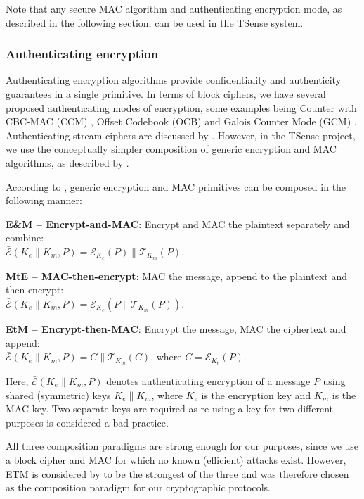 Note that any secure MAC algorithm and authenticating encryption mode, as described in the following section, can be used in the TSense system.

\subsubsection{Authenticating encryption}

Authenticating encryption algorithms provide confidentiality and authenticity guarantees in a single primitive. In terms of block ciphers, we have several proposed authenticating modes of encryption, some examples being Counter with CBC-MAC (CCM) , Offset Codebook (OCB)  and Galois Counter Mode (GCM) . Authenticating stream ciphers are discussed by . However, in the TSense project, we use the conceptually simpler composition of generic encryption and MAC algorithms, as described by .

According to , generic encryption and MAC primitives can be composed in the following manner:
%
\begin{description}
\item \textbf{E\&M -- Encrypt-and-MAC}: Encrypt and MAC the plaintext separately and combine:\\ $\bar{\mathcal{E}}(K_e \parallel K_m,P) = \mathcal{E}_{K_e}(P) \parallel \mathcal{T}_{K_m}(P)$.
\item \textbf{MtE -- MAC-then-encrypt}: MAC the message, append to the plaintext and then encrypt:\\ $\bar{\mathcal{E}}(K_e \parallel K_m,P) =\mathcal{E}_{K_e}(P \parallel \mathcal{T}_{K_m}(P))$.
\item \textbf{EtM -- Encrypt-then-MAC}: Encrypt the message, MAC the ciphertext and append:\\ $\bar{\mathcal{E}}(K_e \parallel K_m,P) = C \parallel \mathcal{T}_{K_m}(C)$, where $C=\mathcal{E}_{K_e}(P)$.
\end{description}
%
Here, $\bar{\mathcal{E}}(K_e \parallel K_m,P)$ denotes authenticating encryption of a message $P$ using shared (symmetric) keys $K_e \parallel K_m$, where $K_e$ is the encryption key and $K_m$ is the MAC key. Two separate keys are required as re-using a key for two different purposes is considered a bad practice.

All three composition paradigms are strong enough for our purposes, since we use a block cipher and MAC for which no known (efficient) attacks exist. However, ETM is considered by \citeauthor{bellare2007} to be the strongest of the three and was therefore chosen as the composition paradigm for our cryptographic protocols.


